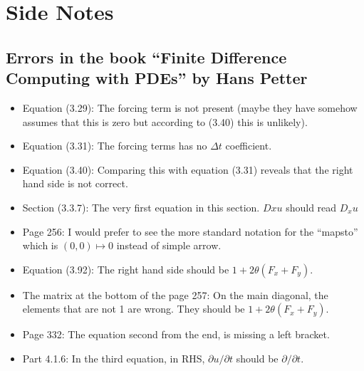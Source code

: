 \chapter{Side Notes}

\section{Errors in the book ``Finite Difference Computing with PDEs'' by Hans Petter}
\begin{itemize}[noitemsep]
	\item Equation (3.29): The forcing term is not present (maybe they have somehow assumes that this is zero but according to (3.40) this is unlikely).
	\item Equation (3.31): The forcing terms has no $ \Delta t $ coefficient.
	\item Equation (3.40): Comparing this with equation (3.31) reveals that the right hand side is not correct.
	\item Section (3.3.7): The very first equation in this section. $ Dxu $ should read $ D_x u $
	\item Page 256: I would prefer to see the more standard notation for the ``mapsto'' which is $ (0,0) \mapsto 0 $ instead of simple arrow.
	\item Equation (3.92): The right hand side should be $ 1 + 2\theta (F_x+F_y) $.
	\item The matrix at the bottom of the page 257: On the main diagonal, the elements that are not 1 are wrong. They should be $ 1 + 2\theta(F_x+F_y) $.
	\item Page 332: The equation second from the end, is missing a left bracket.
	\item Part 4.1.6: In the third equation, in RHS, $ \partial u/\partial t $ should be $ \partial/\partial t $.
\end{itemize}